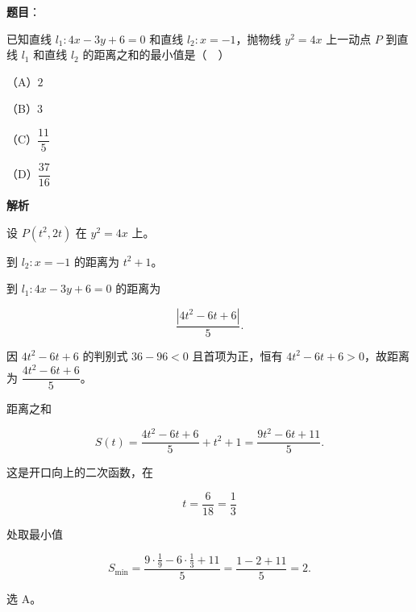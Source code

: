 \begin{answer}

\textbf{题目}：

已知直线 $l_1:4x-3y+6=0$ 和直线 $l_2:x=-1$，抛物线 $y^2=4x$ 上一动点 $P$ 到直线 $l_1$ 和直线 $l_2$ 的距离之和的最小值是（　）

（A）$2$

（B）$3$

（C）$\dfrac{11}{5}$

（D）$\dfrac{37}{16}$

\textbf{解析}

设 $P(t^2,2t)$ 在 $y^2=4x$ 上。

到 $l_2:x=-1$ 的距离为 $t^2+1$。

到 $l_1:4x-3y+6=0$ 的距离为

\nopagebreak[4]
\[\frac{|4t^2-6t+6|}{5}.\]

因 $4t^2-6t+6$ 的判别式 $36-96<0$ 且首项为正，恒有 $4t^2-6t+6>0$，故距离为 $\dfrac{4t^2-6t+6}{5}$。

距离之和

\nopagebreak[4]
\[S(t)=\frac{4t^2-6t+6}{5}+t^2+1=\frac{9t^2-6t+11}{5}.\]

这是开口向上的二次函数，在

\nopagebreak[4]
\[t=\frac{6}{18}=\frac13\]

处取最小值

\nopagebreak[4]
\[S_{\min}=\frac{9\cdot\frac19-6\cdot\frac13+11}{5}=\frac{1-2+11}{5}=2 .\]

选 A。


\end{answer}
